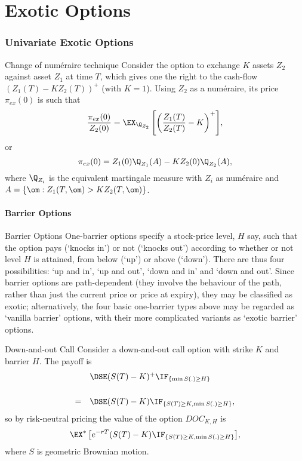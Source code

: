 \part{Exotic Options}
\section{Univariate Exotic Options}
 
Change of num{\'e}raire technique
	Consider the option to exchange $K$ assets $Z_2$ against asset
	$Z_1$ at time $T$, which  gives one the right to the cash-flow
	$(Z_1(T) - KZ_2(T))^+$ (with $K=1$). Using $Z_2$ as a
	num\'{e}raire, its price $\pi_{ex}(0)$ is such that
		$$
		\frac{\pi_{ex}(0)}{Z_2(0)} =
		 \EX_{\Q_{Z_2}} \left[ \left(\frac{Z_1(T)}{Z_2(T)}-K\right)^+\right]\!,
		$$
	or
		$$
		\pi_{ex}(0) = Z_1(0) \Q_{Z_1}(A) - K Z_2(0) \Q_{Z_2}(A),
		$$
	where $\Q_{Z_i}$ is the equivalent martingale measure with $Z_i$
	as num\'{e}raire and $A= \{\om: Z_1(T,\om) >K Z_2(T,\om) \}$.



\subsection{Barrier Options}
Barrier Options
	One-barrier options specify a stock-price level, $H$ say, such
	that the option pays (`knocks in') or not (`knocks out') according
	to whether or not level $H$ is attained, from below (`up') or
	above (`down').  There are thus four possibilities: `up and in',
	`up and out', `down and in' and `down and out'.  Since barrier
	options are path-dependent (they involve the behaviour of the
	path, rather than just the current price or price at expiry), they
	may be classified as exotic; alternatively, the four basic
	one-barrier types above may be regarded as `vanilla barrier'
	options, with their more complicated variants as `exotic barrier'
	options.


Down-and-out Call
	Consider a down-and-out call option with strike $K$ and barrier $H$. The payoff is
		$$
		\begin{array}{ll}
		&\DSE (S(T) - K)^+ \IF_{\{\min S(.) \geq H\}}\\*[18pt] =&\DSE
		(S(T) - K) \IF_{\{S(T) \geq K, \min S(.) \geq H\}},
		\end{array}
		$$
	so by risk-neutral pricing the value of the option ${DOC}_{K,H}$ is
		$$
		\EX^*\left[e^{-rT} (S(T) - K) \IF_{\{S(T) \geq K, \min S(.) \geq
		H\}}\right]\!,
		$$
	where $S$ is geometric Brownian motion.


